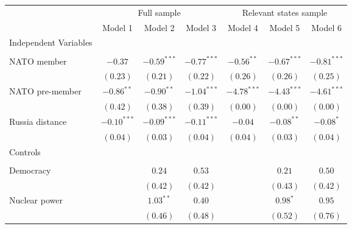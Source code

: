 
\begin{table}[h]
\begin{center}
\begin{tabular}{l c c c c c c}
\hline
 & \multicolumn{3}{c}{Full sample} & \multicolumn{3}{c}{Relevant states sample} \\
\cline{2-4} \cline{5-7}
 & Model 1 & Model 2 & Model 3 & Model 4 & Model 5 & Model 6 \\
\hline
Independent Variables &               &               &               &               &               &               \\
                      &               &               &               &               &               &               \\
\quad NATO member     & $-0.37$       & $-0.59^{***}$ & $-0.77^{***}$ & $-0.56^{**}$  & $-0.67^{***}$ & $-0.81^{***}$ \\
                      & $(0.23)$      & $(0.21)$      & $(0.22)$      & $(0.26)$      & $(0.26)$      & $(0.25)$      \\
\quad NATO pre-member & $-0.86^{**}$  & $-0.90^{**}$  & $-1.04^{***}$ & $-4.78^{***}$ & $-4.43^{***}$ & $-4.61^{***}$ \\
                      & $(0.42)$      & $(0.38)$      & $(0.39)$      & $(0.00)$      & $(0.00)$      & $(0.00)$      \\
\quad Russia distance & $-0.10^{***}$ & $-0.09^{***}$ & $-0.11^{***}$ & $-0.04$       & $-0.08^{**}$  & $-0.08^{*}$   \\
                      & $(0.04)$      & $(0.03)$      & $(0.04)$      & $(0.04)$      & $(0.03)$      & $(0.04)$      \\
Controls              &               &               &               &               &               &               \\
                      &               &               &               &               &               &               \\
\quad Democracy       &               & $0.24$        & $0.53$        &               & $0.21$        & $0.50$        \\
                      &               & $(0.42)$      & $(0.42)$      &               & $(0.43)$      & $(0.42)$      \\
\quad Nuclear power   &               & $1.03^{**}$   & $0.40$        &               & $0.98^{*}$    & $0.95$        \\
                      &               & $(0.46)$      & $(0.48)$      &               & $(0.52)$      & $(0.76)$      \\

\end{tabular}
\end{center}
\end{table}
